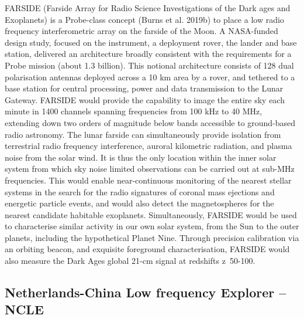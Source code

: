 FARSIDE (Farside Array for Radio Science Investigations of the Dark ages and Exoplanets) is a Probe-class concept (Burns et al. 2019b) to place a low radio frequency interferometric array on the farside of the Moon. A NASA-funded design study, focused on the instrument, a deployment rover, the lander and base station, delivered an architecture broadly consistent with the requirements for a Probe mission (about 1.3 billion). This notional architecture consists of 128 dual polarisation antennas deployed across a 10 km area by a rover, and tethered to a base station for central processing, power and data transmission to the Lunar Gateway. FARSIDE would provide the capability to image the entire sky each minute in 1400 channels spanning frequencies from 100 kHz to 40 MHz, extending down two orders of magnitude below bands accessible to ground-based radio astronomy. The lunar farside can simultaneously provide isolation from terrestrial radio frequency interference, auroral kilometric radiation, and plasma noise from the solar wind. It is thus the only location within the inner solar system from which sky noise limited observations can be carried out at sub-MHz frequencies. This would enable near-continuous monitoring of the nearest stellar systems in the search for the radio signatures of coronal mass ejections and energetic particle events, and would also detect the magnetospheres for the nearest candidate habitable exoplanets. Simultaneously, FARSIDE would be used to characterise similar activity in our own solar system, from the Sun to the outer planets, including the hypothetical Planet Nine. Through precision calibration via an orbiting beacon, and exquisite foreground characterisation, FARSIDE would also measure the Dark Ages global 21-cm signal at redshifts z~50-100.





\subsection{Netherlands-China Low frequency Explorer -- NCLE}

